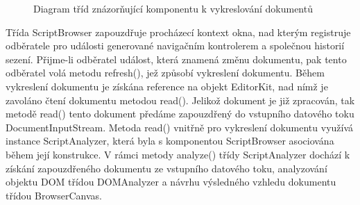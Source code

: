 \begin{figure}[H]
  \begin{center}
    \caption{Diagram tříd znázorňující komponentu k vykreslování dokumentů}
    \label{Figure.ScriptBrowserUserAgent}
  \end{center}
\end{figure}

Třída ScriptBrowser zapouzdřuje procházecí kontext okna, nad kterým registruje odběratele pro události generované navigačním kontrolerem a společnou historií sezení. Přijme-li odběratel událost, která znamená změnu dokumentu, pak tento odběratel volá metodu refresh(), jež způsobí vykreslení dokumentu. Během vykreslení dokumentu je získána reference na objekt EditorKit, nad nímž je zavoláno čtení dokumentu metodou read(). Jelikož dokument je již zpracován, tak metodě read() tento dokument předáme zapouzdřený do vstupního datového toku DocumentInputStream. Metoda read() vnitřně pro vykreslení dokumentu využívá instance ScriptAnalyzer, která byla s komponentou ScriptBrowser asociována během její konstrukce. V rámci metody analyze() třídy ScriptAnalyzer dochází k  získání zapouzdřeného dokumentu ze vstupního datového toku, analyzování objektu DOM třídou DOMAnalyzer a návrhu výsledného vzhledu dokumentu třídou BrowserCanvas.

